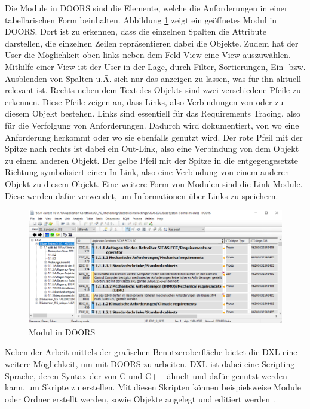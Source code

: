 Die Module in \acs{DOORS} sind die Elemente, welche die Anforderungen in einer tabellarischen Form beinhalten. Abbildung \ref*{fig:Doors Modul} zeigt ein geöffnetes Modul in \acs{DOORS}. Dort ist zu erkennen,
dass die einzelnen Spalten die Attribute darstellen, die einzelnen Zeilen repräsentieren dabei die Objekte. Zudem hat der User die Möglichkeit oben links neben dem Feld \glqq View\grqq{} eine View auszuwählen. 
Mithilfe einer View ist der User in der Lage, durch Filter, Sortierungen, Ein- bzw. Ausblenden von Spalten u.Ä. sich nur das anzeigen zu lassen, was für ihn aktuell relevant ist. Rechts neben dem Text des 
Objekts sind zwei verschiedene Pfeile zu erkennen. Diese Pfeile zeigen an, dass Links, also Verbindungen von oder zu diesem Objekt bestehen. Links sind essentiell für das Requirements Tracing, also für die
Verfolgung von Anforderungen. Dadurch wird dokumentiert, von wo eine Anforderung herkommt oder wo sie ebenfalls genutzt wird. Der rote Pfeil mit der Spitze nach rechts ist dabei ein Out-Link, also eine
Verbindung von dem Objekt zu einem anderen Objekt. Der gelbe Pfeil mit der Spitze in die entgegengesetzte Richtung symbolisiert einen In-Link, also eine Verbindung von einem anderen Objekt zu diesem 
Objekt. Eine weitere Form von Modulen sind die Link-Module. Diese werden dafür verwendet, um Informationen über Links zu speichern. 

\begin{figure}[H]
    \centering
    \includegraphics[width = \textwidth]{abbildungen/Modul in Doors.PNG}
    \caption{Modul in \acs{DOORS}}
    \label{fig:Doors Modul}
\end{figure}

Neben der Arbeit mittels der grafischen Benutzeroberfläche bietet die \ac*{DXL} eine weitere Möglichkeit, um mit \acs{DOORS} zu arbeiten. \acs{DXL} ist dabei eine Scripting-Sprache, deren
Syntax der von C und C++ ähnelt und dafür genutzt werden kann, um Skripte zu erstellen. Mit diesen Skripten können beispielsweise Module oder Ordner erstellt werden, sowie Objekte angelegt und 
editiert werden \cite[]{q7}. 